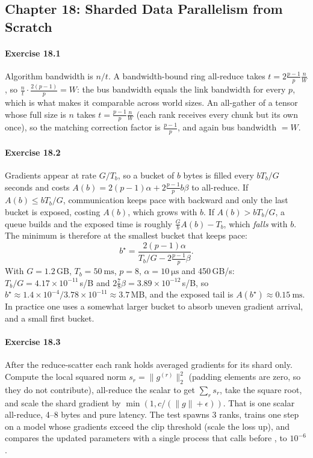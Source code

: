 \subsection*{Chapter 18: Sharded Data Parallelism from Scratch}

\paragraph{Exercise 18.1}
Algorithm bandwidth is $n/t$. A bandwidth-bound ring all-reduce takes $t = 2\frac{p-1}{p}\frac{n}{W}$,
so $\frac{n}{t}\cdot\frac{2(p-1)}{p} = W$: the bus bandwidth equals the link bandwidth for every $p$,
which is what makes it comparable across world sizes. An all-gather of a tensor whose full size is $n$ takes
$t = \frac{p-1}{p}\frac{n}{W}$ (each rank receives every chunk but its own once), so the matching
correction factor is $\frac{p-1}{p}$, and again bus bandwidth $=W$.

\paragraph{Exercise 18.2}
Gradients appear at rate $G/T_b$, so a bucket of $b$ bytes is filled every $bT_b/G$ seconds and costs
$A(b) = 2(p-1)\alpha + 2\frac{p-1}{p}b\beta$ to all-reduce. If $A(b) \le bT_b/G$, communication keeps
pace with backward and only the last bucket is exposed, costing $A(b)$, which grows with $b$. If
$A(b) > bT_b/G$, a queue builds and the exposed time is roughly $\frac{G}{b}A(b) - T_b$, which
\emph{falls} with $b$. The minimum is therefore at the smallest bucket that keeps pace:
\[
  b^\star = \frac{2(p-1)\alpha}{T_b/G - 2\frac{p-1}{p}\beta}.
\]
With $G=1.2$\,GB, $T_b=\SI{50}{\milli\second}$, $p=8$, $\alpha=\SI{10}{\micro\second}$ and 450\,GB/s:
$T_b/G = 4.17\times10^{-11}$\,s/B and $2\frac78\beta = 3.89\times10^{-12}$\,s/B, so
$b^\star \approx 1.4\times10^{-4}/3.78\times10^{-11}\approx3.7$\,MB, and the exposed tail is
$A(b^\star)\approx\SI{0.15}{\milli\second}$. In practice one uses a somewhat larger bucket to absorb
uneven gradient arrival, and a small first bucket.

\paragraph{Exercise 18.3}
After the reduce-scatter each rank holds averaged gradients for its shard only. Compute the local
squared norm $s_r = \lVert g^{(r)}\rVert_2^2$ (padding elements are zero, so they do not contribute),
all-reduce the scalar to get $\sum_r s_r$, take the square root, and scale the shard gradient by
$\min(1, c/(\lVert g\rVert + \epsilon))$. That is one scalar all-reduce, 4--8 bytes and pure
latency. The test spawns 3 ranks, trains one step on a model whose gradients exceed the clip threshold
(scale the loss up), and compares the updated parameters with a single process that calls
 before , to $10^{-6}$.


